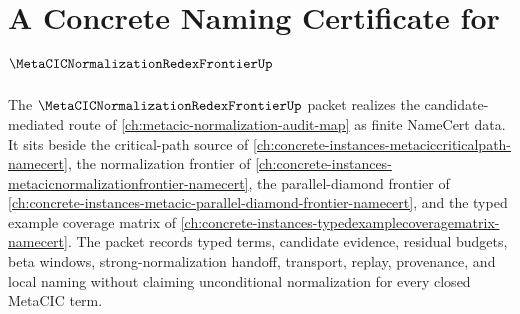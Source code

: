 \chapter{A Concrete Naming Certificate for $\MetaCICNormalizationRedexFrontierUp$}
\label{ch:concrete-instances-metacic-normalization-redex-frontier-namecert}

The $\MetaCICNormalizationRedexFrontierUp$ packet realizes the candidate-mediated route of \autoref{ch:metacic-normalization-audit-map} as finite NameCert data. It sits beside the critical-path source of \autoref{ch:concrete-instances-metaciccriticalpath-namecert}, the normalization frontier of \autoref{ch:concrete-instances-metacicnormalizationfrontier-namecert}, the parallel-diamond frontier of \autoref{ch:concrete-instances-metacic-parallel-diamond-frontier-namecert}, and the typed example coverage matrix of \autoref{ch:concrete-instances-typedexamplecoveragematrix-namecert}. The packet records typed terms, candidate evidence, residual budgets, beta windows, strong-normalization handoff, transport, replay, provenance, and local naming without claiming unconditional normalization for every closed MetaCIC term.

